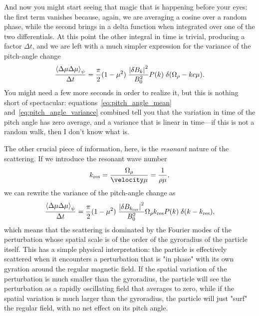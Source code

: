 And now you might start seeing that magic that is happening before your eyes: the
first term vanishes because, again, we are averaging a cosine over a random phase,
while the second brings in a delta function when integrated over one of the two differentials. At this
point the other integral in time is trivial, producing a factor $\Delta t$,
and we are left with a much simpler expression for the variance of the pitch-angle
change
\begin{align}\label{eq:pitch_angle_variance}
  \frac{\left<\Delta \mu \Delta \mu\right>_\psi}{\Delta t} =
  \frac{\pi}{2} (1 - \mu^2) \; \frac{\abs{\delta B_k}^2}{B_0^2} P(k)
  \; \delta(\Omega_{\rho} - kc\mu).
\end{align}
You might need a few more seconds in order to realize it, but this is nothing short
of spectacular: equations~\eqref{eq:pitch_angle_mean} and~\eqref{eq:pitch_angle_variance}
combined tell you that the variation in time of the pitch angle has zero average, and
a variance that is linear in time---if this is not a random walk, then I don't know what is.

The other crucial piece of information, here, is the \emph{resonant} nature of the
scattering. If we introduce the resonant wave number
\begin{align*}
  k_\text{res} = \frac{\Omega_\gyrorad}{\velocity\mu} = \frac{1}{\gyrorad \mu},
\end{align*}
we can rewrite the variance of the pitch-angle change as
\begin{align*}
  \frac{\left<\Delta \mu \Delta \mu\right>_\psi}{\Delta t} =
  \frac{\pi}{2} (1 - \mu^2) \; \frac{\abs{\delta B_{k_\text{res}}}^2}{B_0^2}
  \Omega_{\rho} k_\text{res} P(k) \; \delta(k - k_\text{res}),
\end{align*}
which means that the scattering is dominated by the Fourier modes of the perturbation
whose spatial scale is of the order of the gyroradius of the particle itself. This has
a simple physical interpretation: the particle is effectively scattered when it encounters
a perturbation that is "in phase" with its own gyration around the regular magnetic field.
If the spatial variation of the perturbation is much smaller than the gyroradius,
the particle will see the perturbation as a rapidly oscillating field that averages to zero,
while if the spatial variation is much larger than the gyroradius, the particle will
just "surf" the regular field, with no net effect on its pitch angle.

